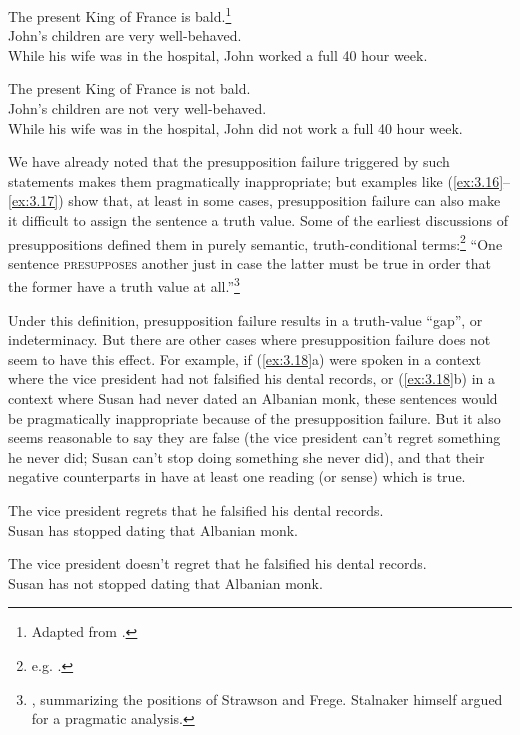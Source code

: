 \ea \label{ex:3.16}
\ea The present King of France is bald.\footnote{Adapted from \citet{Russell1905}.} \\
\ex John’s children are very well-behaved.\\
\ex While his wife was in the hospital, John worked a full 40 hour week.
                       \z
\z

\ea \label{ex:3.17}
\ea The present King of France is not bald.\\
\ex John’s children are not very well-behaved.\\
\ex While his wife was in the hospital, John did not work a full 40 hour week.
                       \z
\z


We have already noted that the presupposition failure triggered by such statements makes them pragmatically inappropriate; but examples like (\ref{ex:3.16}--\ref{ex:3.17}) show that, at least in some cases, presupposition failure can also make it difficult to assign the sentence a truth value. Some of the earliest discussions of presuppositions defined them in purely semantic, truth-conditional terms:\footnote{e.g. \citet{Frege1892,Strawson1950,Strawson1952}.} “One sentence \textsc{presupposes} another just in case the latter must be true in order that the former have a truth value at all.”\footnote{\citet[447]{Stalnaker1973}, summarizing the positions of Strawson and Frege. Stalnaker himself argued for a pragmatic analysis.}



Under this definition, presupposition failure results in a truth-value “gap”, or indeterminacy. But there are other cases where presupposition failure does not seem to have this effect. For example, if (\ref{ex:3.18}a) were spoken in a context where the vice president had not falsified his dental records, or (\ref{ex:3.18}b) in a context where Susan had never dated an Albanian monk, these sentences would be pragmatically inappropriate because of the presupposition failure. But it also seems reasonable to say they are false (the vice president can’t regret something he never did; Susan can’t stop doing something she never did), and that their negative counterparts in  have at least one reading (or sense) which is true. 


\ea \label{ex:3.18}
\ea The vice president regrets that he falsified his dental records.\\
\ex Susan has stopped dating that Albanian monk.
\z
                       \z

\ea \label{ex:3.19}
\ea The vice president doesn’t regret that he falsified his dental records.\\
\ex Susan has not stopped dating that Albanian monk.
                       \z
\z


